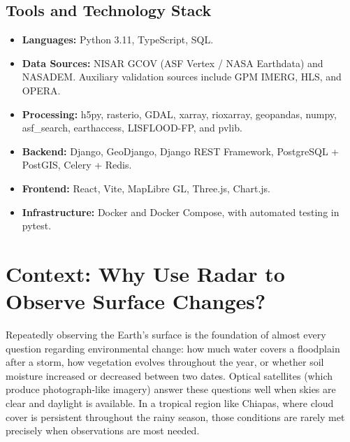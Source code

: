 \documentclass[11pt,a4paper]{article}
\begin{document}
\subsection{Tools and Technology Stack}

\begin{itemize}
  \item \textbf{Languages:} Python 3.11, TypeScript, SQL.
  \item \textbf{Data Sources:} NISAR GCOV (ASF Vertex / NASA Earthdata) and NASADEM. Auxiliary validation sources include GPM IMERG, HLS, and OPERA.
  \item \textbf{Processing:} h5py, rasterio, GDAL, xarray, rioxarray, geopandas, numpy, asf\_search,
        earthaccess, LISFLOOD-FP, and pvlib.
  \item \textbf{Backend:} Django, GeoDjango, Django REST Framework, PostgreSQL + PostGIS, Celery + Redis.
  \item \textbf{Frontend:} React, Vite, MapLibre GL, Three.js, Chart.js.
  \item \textbf{Infrastructure:} Docker and Docker Compose, with automated testing in pytest.
\end{itemize}

\section{Context: Why Use Radar to Observe Surface Changes?}
\label{sec:contexto}

Repeatedly observing the Earth's surface is the foundation of almost every question regarding environmental change:
how much water covers a floodplain after a storm, how vegetation evolves throughout the year, or whether
soil moisture increased or decreased between two dates. Optical satellites (which produce photograph-like imagery) answer these questions well when skies are clear and daylight is available. In a tropical region like Chiapas, where cloud cover is persistent throughout the rainy season, those conditions are rarely met precisely when observations are most needed.
\end{document}

